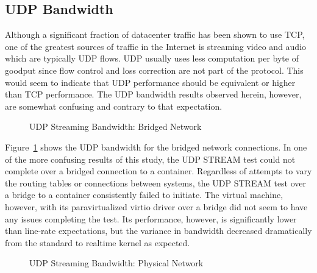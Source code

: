 \subsection{UDP Bandwidth} %
\label{sub:udpbandwidth}
Although a significant fraction of datacenter traffic has been shown to use TCP, one of the greatest sources of traffic in the Internet is streaming video and audio which are typically UDP flows.
UDP usually uses less computation per byte of goodput since flow control and loss correction are not part of the protocol.  
This would seem to indicate that UDP performance should be equivalent or higher than TCP performance.  
The UDP bandwidth results observed herein, however, are somewhat confusing and contrary to that expectation.

\begin{figure}
    \centering
    \def\svgwidth{\columnwidth}
    
    \caption{UDP Streaming Bandwidth: Bridged Network}
    \label{fig:udp_stream_bridge}
\end{figure}
Figure~\ref{fig:udp_stream_bridge} shows the UDP bandwidth for the bridged network connections.  
In one of the more confusing results of this study, the UDP STREAM test could not complete over a bridged connection to a container.
Regardless of attempts to vary the routing tables or connections between systems, the UDP STREAM test over a bridge to a container consistently failed to initiate.
The virtual machine, however, with its paravirtualized virtio driver over a bridge did not seem to have any issues completing the test.  
Its performance, however, is significantly lower than line-rate expectations, but the variance in bandwidth decreased dramatically from the standard to realtime kernel as expected.  

\begin{figure}
    \centering
    \def\svgwidth{\columnwidth}
    
    \caption{UDP Streaming Bandwidth: Physical Network}
    \label{fig:udp_stream_phys}
\end{figure}

